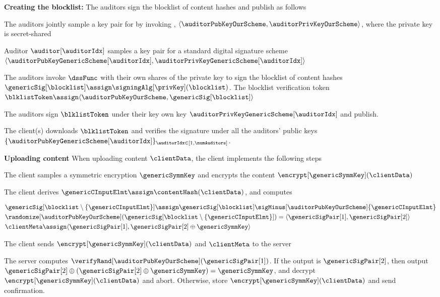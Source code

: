 \itemListStart
\item \textbf{Creating the blocklist:} The auditors sign the blocklist \blocklist of content hashes and publish as follows
\enumListStart 
\item The auditors jointly sample a key pair for  by invoking \dssFunc, $\langle \auditorPubKeyOurScheme, \auditorPrivKeyOurScheme \rangle$, where the private key is secret-shared
\item Auditor $\auditor[\auditorIdx]$ samples a key pair for a standard digital signature scheme $\langle \auditorPubKeyGenericScheme[\auditorIdx], \auditorPrivKeyGenericScheme[\auditorIdx] \rangle$
\item The auditors invoke $\dssFunc$ with their own shares of the private key to sign the blocklist of content hashes $\genericSig[\blocklist] \assign \signingAlg[\privKey](\blocklist)$. The blocklist verification token $\blklistToken \assign \langle \auditorPubKeyOurScheme, \genericSig[\blocklist] \rangle$
\item The auditors sign $\blklistToken$ under their key own key $ \auditorPrivKeyGenericScheme[\auditorIdx]$ and publish. 
\item The client(s) downloads $\blklistToken$ and verifies the signature under all the auditors' public keys $\{\auditorPubKeyGenericScheme[\auditorIdx]\}_{\auditorIdx \in [1, \numAuditors]}$. 
\enumListEnd
\item \textbf{Uploading content} When uploading content $\clientData$, the client implements the following steps
\enumListStart
\item The client samples a symmetric encryption $\genericSymmKey$ and encrypts the content $\encrypt[\genericSymmKey](\clientData)$
\item The client derives $\genericCInputElmt \assign \contentHash(\clientData)$, and computes 

\begin{align*}
&\genericSig[\blocklist \setminus \{\genericCInputElmt\}] \assign \genericSig[\blocklist] \sigMinus[\auditorPubKeyOurScheme] \{ \genericCInputElmt \} \\
&\randomize[\auditorPubKeyOurScheme](\genericSig[\blocklist \setminus \{\genericCInputElmt \}]) = \langle \genericSigPair[1], \genericSigPair[2] \rangle \\
&\clientMeta \assign \langle \genericSigPair[1], \genericSigPair[2] \oplus \genericSymmKey \rangle
\end{align*}

The client sends $\encrypt[\genericSymmKey](\clientData)$ and $\clientMeta$ to the server

\item The server computes $\verifyRand[\auditorPubKeyOurScheme](\genericSigPair[1])$. If the output is $\genericSigPair[2]$, then output $\genericSigPair[2] \oplus (\genericSigPair[2] \oplus \genericSymmKey) = \genericSymmKey$, and decrypt $\encrypt[\genericSymmKey](\clientData)$ and abort. Otherwise, store $\encrypt[\genericSymmKey](\clientData)$ and send confirmation. 
\enumListEnd



\itemListEnd